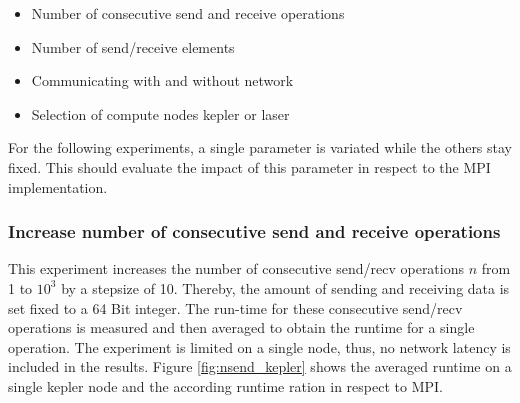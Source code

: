 \begin{itemize}
  \item Number of consecutive send and receive operations
  \item Number of send/receive elements
  \item Communicating with and without network
  \item Selection of compute nodes kepler or laser
\end{itemize}

For the following experiments, a single parameter is variated while
the others stay fixed. This should evaluate the impact of this
parameter in respect to the MPI implementation.

\subsubsection*{Increase number of consecutive send and receive operations}
This experiment increases the number of consecutive send/recv
operations $n$ from 1 to $10^3$ by a stepsize of 10. Thereby, the amount of
sending and receiving data is set fixed to a 64 Bit integer.  The
run-time for these consecutive send/recv operations is measured and
then averaged to obtain the runtime for a single operation.  The
experiment is limited on a single node, thus, no network latency is
included in the results.  Figure \ref{fig:nsend_kepler} shows the
averaged runtime on a single kepler node and the according runtime
ration in respect to MPI.


